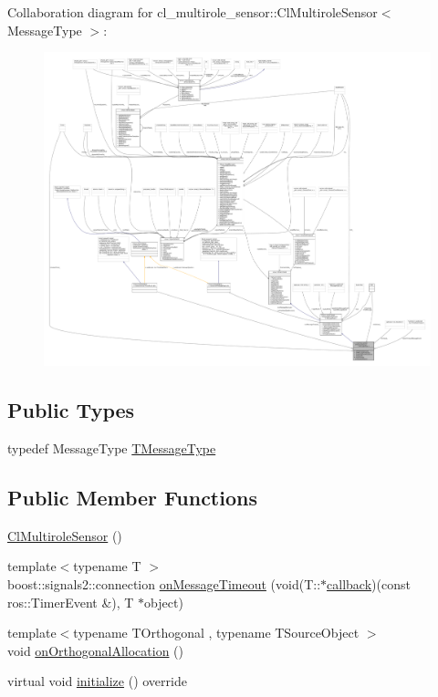 Collaboration diagram for cl\+\_\+multirole\+\_\+sensor\+:\+:Cl\+Multirole\+Sensor$<$ Message\+Type $>$\+:
\nopagebreak
\begin{figure}[H]
\begin{center}
\leavevmode
\includegraphics[width=350pt]{classcl__multirole__sensor_1_1ClMultiroleSensor__coll__graph}
\end{center}
\end{figure}
\subsection*{Public Types}
\begin{DoxyCompactItemize}
\item 
typedef Message\+Type \hyperlink{classcl__multirole__sensor_1_1ClMultiroleSensor_a76f2c1e5c54556bacdaf0aaf809972da}{T\+Message\+Type}
\end{DoxyCompactItemize}
\subsection*{Public Member Functions}
\begin{DoxyCompactItemize}
\item 
\hyperlink{classcl__multirole__sensor_1_1ClMultiroleSensor_a25fcca3996fb5cbd5aa46cae4170e75e}{Cl\+Multirole\+Sensor} ()
\item 
{\footnotesize template$<$typename T $>$ }\\boost\+::signals2\+::connection \hyperlink{classcl__multirole__sensor_1_1ClMultiroleSensor_a9a2ffac7f03e1570bedc246ea4b00078}{on\+Message\+Timeout} (void(T\+::$\ast$\hyperlink{sm__ridgeback__barrel__search__2_2servers_2opencv__perception__node_2opencv__perception__node_8cpp_a050e697bd654facce10ea3f6549669b3}{callback})(const ros\+::\+Timer\+Event \&), T $\ast$object)
\item 
{\footnotesize template$<$typename T\+Orthogonal , typename T\+Source\+Object $>$ }\\void \hyperlink{classcl__multirole__sensor_1_1ClMultiroleSensor_a1626a5caea2f4ea03052f70fe0117d83}{on\+Orthogonal\+Allocation} ()
\item 
virtual void \hyperlink{classcl__multirole__sensor_1_1ClMultiroleSensor_a3847e19f925f65dd034964eb2d0b3594}{initialize} () override
\end{DoxyCompactItemize}
